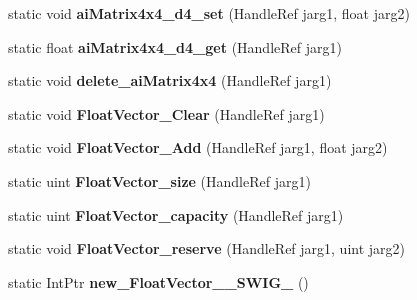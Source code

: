 \begin{DoxyCompactItemize}
\item 
\hypertarget{class_assimp_p_i_n_v_o_k_e_a094a639cdc6e18ad67756f285dfde5a3}{static void {\bfseries ai\+Matrix4x4\+\_\+d4\+\_\+set} (Handle\+Ref jarg1, float jarg2)}\label{class_assimp_p_i_n_v_o_k_e_a094a639cdc6e18ad67756f285dfde5a3}

\item 
\hypertarget{class_assimp_p_i_n_v_o_k_e_ac830b5f90afb8410091d11d7b3d1a243}{static float {\bfseries ai\+Matrix4x4\+\_\+d4\+\_\+get} (Handle\+Ref jarg1)}\label{class_assimp_p_i_n_v_o_k_e_ac830b5f90afb8410091d11d7b3d1a243}

\item 
\hypertarget{class_assimp_p_i_n_v_o_k_e_a3cd17f652f508a54696310daa06c5373}{static void {\bfseries delete\+\_\+ai\+Matrix4x4} (Handle\+Ref jarg1)}\label{class_assimp_p_i_n_v_o_k_e_a3cd17f652f508a54696310daa06c5373}

\item 
\hypertarget{class_assimp_p_i_n_v_o_k_e_a6a50cdea91b6ec9e881f4e19ab6b50a1}{static void {\bfseries Float\+Vector\+\_\+\+Clear} (Handle\+Ref jarg1)}\label{class_assimp_p_i_n_v_o_k_e_a6a50cdea91b6ec9e881f4e19ab6b50a1}

\item 
\hypertarget{class_assimp_p_i_n_v_o_k_e_a2619282cab4ecf710c8fd902edf4f3a9}{static void {\bfseries Float\+Vector\+\_\+\+Add} (Handle\+Ref jarg1, float jarg2)}\label{class_assimp_p_i_n_v_o_k_e_a2619282cab4ecf710c8fd902edf4f3a9}

\item 
\hypertarget{class_assimp_p_i_n_v_o_k_e_a672179c8f8b7610c7babec8f1b3729ff}{static uint {\bfseries Float\+Vector\+\_\+size} (Handle\+Ref jarg1)}\label{class_assimp_p_i_n_v_o_k_e_a672179c8f8b7610c7babec8f1b3729ff}

\item 
\hypertarget{class_assimp_p_i_n_v_o_k_e_a2c7155c1302b03ee518f2feb297a9908}{static uint {\bfseries Float\+Vector\+\_\+capacity} (Handle\+Ref jarg1)}\label{class_assimp_p_i_n_v_o_k_e_a2c7155c1302b03ee518f2feb297a9908}

\item 
\hypertarget{class_assimp_p_i_n_v_o_k_e_a12c13640a80c124224822fcc5acd0440}{static void {\bfseries Float\+Vector\+\_\+reserve} (Handle\+Ref jarg1, uint jarg2)}\label{class_assimp_p_i_n_v_o_k_e_a12c13640a80c124224822fcc5acd0440}

\item 
\hypertarget{class_assimp_p_i_n_v_o_k_e_a8bf47ccf82bec462800013813f4d369d}{static Int\+Ptr {\bfseries new\+\_\+\+Float\+Vector\+\_\+\+\_\+\+S\+W\+I\+G\+\_} ()}\label{class_assimp_p_i_n_v_o_k_e_a8bf47ccf82bec462800013813f4d369d}


\end{DoxyCompactItemize}
